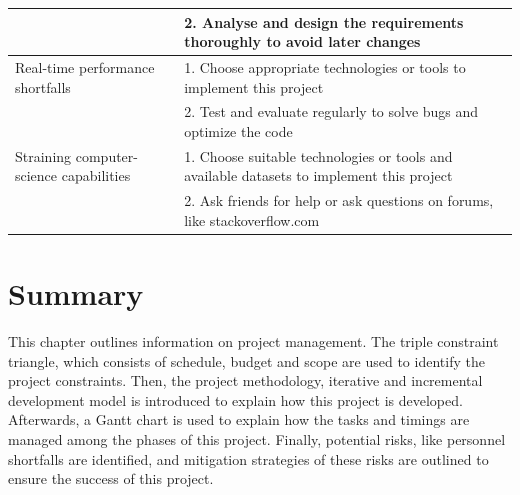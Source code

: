 \begin{table}[H]
\begin{tabular}{|p{4cm}|p{10cm}|}
                                         & 2. Analyse and design the requirements thoroughly to avoid later changes                               \\ \hline
Real-time performance shortfalls         & 1. Choose appropriate technologies or tools to implement this project                                  \\
                                         & 2. Test and evaluate regularly to solve bugs and optimize the code                                     \\ \hline
Straining computer-science capabilities  & 1. Choose suitable technologies or tools and available datasets to implement this project              \\
                                         & 2. Ask friends for help or ask questions on forums, like stackoverflow.com                             \\ \hline
\end{tabular}
\end{table}


\section{Summary}
This chapter outlines information on project management. The triple constraint triangle, which consists of schedule, budget and scope are used to identify the project constraints. Then, the project methodology, iterative and incremental development model is introduced to explain how this project is developed. Afterwards, a Gantt chart is used to explain how the tasks and timings are managed among the phases of this project. Finally, potential risks, like personnel shortfalls are identified, and mitigation strategies of these risks are outlined to ensure the success of this project.

